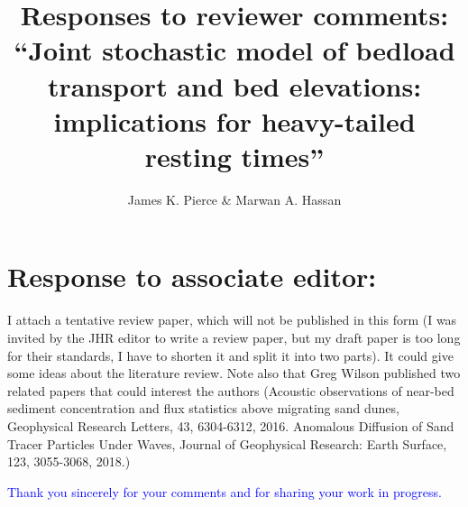 \documentclass[11pt]{article}
\begin{document}
\title{Responses to reviewer comments: ``Joint stochastic model of bedload transport and bed elevations: implications for heavy-tailed resting times''}
\author{James K. Pierce \& Marwan A. Hassan}
\maketitle

\section*{Response to associate editor:}

I attach a tentative review paper, which will not be published in this form (I was invited by the JHR editor to write a review paper, but my draft paper is too long for their standards, I have to shorten it and split it into two parts). It could give some ideas about the literature review. Note also that Greg Wilson published two related papers that could interest the authors (Acoustic observations of near-bed sediment concentration and flux statistics above migrating sand dunes, Geophysical Research Letters, 43, 6304-6312, 2016. Anomalous Diffusion of Sand Tracer Particles Under Waves, Journal of Geophysical Research: Earth Surface, 123, 3055-3068, 2018.)

\textcolor{blue}{
Thank you sincerely for your comments and for sharing your work in progress. }
\end{document}
